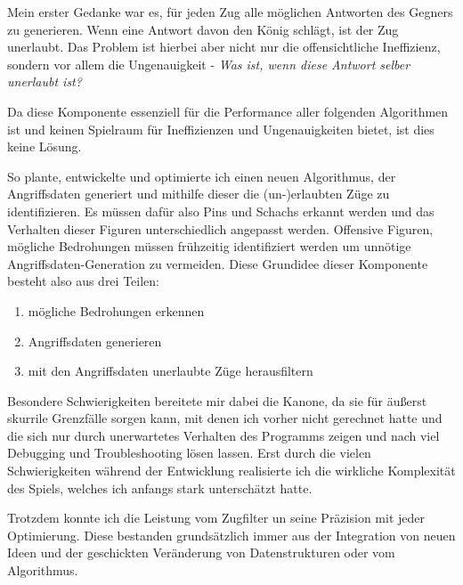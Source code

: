 \documentclass[
  manuscript=article,  %
  layout=publish,  %
  year=2023,
  volume=1,
]{extra/joas}
\begin{document}
Mein erster Gedanke war es, für jeden Zug alle möglichen Antworten des Gegners zu generieren. Wenn eine Antwort davon den König schlägt, ist der Zug unerlaubt. Das Problem ist hierbei aber nicht nur die offensichtliche Ineffizienz, sondern vor allem die Ungenauigkeit - \textit{Was ist, wenn diese Antwort selber unerlaubt ist?}

Da diese Komponente essenziell für die Performance aller folgenden Algorithmen ist und keinen Spielraum für Ineffizienzen und Ungenauigkeiten bietet, ist dies keine Lösung.

So plante, entwickelte und optimierte ich einen neuen Algorithmus, der Angriffsdaten generiert und mithilfe dieser die (un-)erlaubten Züge zu identifizieren.
Es müssen dafür also Pins und Schachs erkannt werden und das Verhalten dieser Figuren unterschiedlich angepasst werden. Offensive Figuren, mögliche Bedrohungen müssen frühzeitig identifiziert werden um unnötige Angriffsdaten-Generation zu vermeiden.
Diese Grundidee dieser Komponente besteht also aus drei Teilen:
\begin{enumerate}
    \item mögliche Bedrohungen erkennen
    \item Angriffsdaten generieren
    \item mit den Angriffsdaten unerlaubte Züge herausfiltern
\end{enumerate}

Besondere Schwierigkeiten bereitete mir dabei die Kanone, da sie für äußerst skurrile Grenzfälle sorgen kann, mit denen ich vorher nicht gerechnet hatte und die sich nur durch unerwartetes Verhalten des Programms zeigen und nach viel Debugging und Troubleshooting lösen lassen. Erst durch die vielen Schwierigkeiten während der Entwicklung realisierte ich die wirkliche Komplexität des Spiels, welches ich anfangs stark unterschätzt hatte.

Trotzdem konnte ich die Leistung vom Zugfilter un seine Präzision mit jeder Optimierung. Diese bestanden grundsätzlich immer aus der Integration von neuen Ideen und der geschickten Veränderung von Datenstrukturen oder vom Algorithmus.
\end{document}
